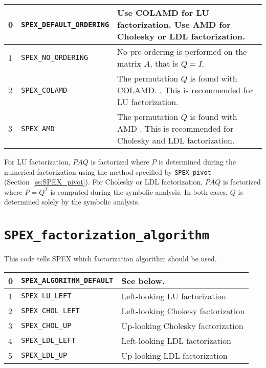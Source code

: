 \documentclass[12pt,oneside]{book}
\theoremstyle{definition}
\newenvironment{SizedCenteredTabular}[2][\small]
    {   
        #1\begin{center}\begin{tabular}{#2}
    }{ 
        \end{tabular}\end{center}
    }
\begin{document}
\begin{SizedCenteredTabular}{llp{4in}} \hline
    0 & \verb'SPEX_DEFAULT_ORDERING' & Use COLAMD for LU factorization.
        Use AMD for Cholesky or LDL factorization. \\ \hline
    1 & \verb|SPEX_NO_ORDERING| & No pre-ordering is performed on the matrix $A$,
                                  that is $Q = I$. \\ \hline
    2 & \verb|SPEX_COLAMD|      & The permutation $Q$ is found with COLAMD.
                                  \cite{davis2004algorithmcolamd}.
                                  This is recommended for LU factorization.
                                  \\ \hline
    3 & \verb|SPEX_AMD|         & The permutation $Q$ is found with AMD
                                 \cite{amestoy2004algorithmamd}.
                                 This is recommended for Cholesky and LDL factorization.
                                 \\ \hline
\end{SizedCenteredTabular}

For LU factorization, $PAQ$ is factorized where $P$ is determined during the
numerical factorization using the method specified by \verb'SPEX_pivot' 
(Section~\ref{ss:SPEX_pivot}).
For Cholesky or LDL factorization, $PAQ$ is factorized
where $P=Q^T$ is computed during the symbolic analysis.
In both cases, $Q$ is determined solely by the symbolic analysis.

\section{\texttt{SPEX\_factorization\_algorithm}} \label{ss:SPEX_factorization_algorithm}
This code tells SPEX which factorization algorithm should be used.

\begin{SizedCenteredTabular}{llp{4in}} \hline
    0 & \verb'SPEX_ALGORITHM_DEFAULT' & See below. \\ \hline
    1 & \verb|SPEX_LU_LEFT|      & Left-looking LU factorization \\ \hline
    2 & \verb|SPEX_CHOL_LEFT|    & Left-looking Chokesy factorization\\ \hline
    3 & \verb|SPEX_CHOL_UP|      & Up-looking Cholesky factorization \\ \hline
    4 & \verb|SPEX_LDL_LEFT|     & Left-looking LDL factorization \\ \hline
    5 & \verb|SPEX_LDL_UP|       & Up-looking LDL factorization \\ \hline
\end{SizedCenteredTabular}
\end{document}
